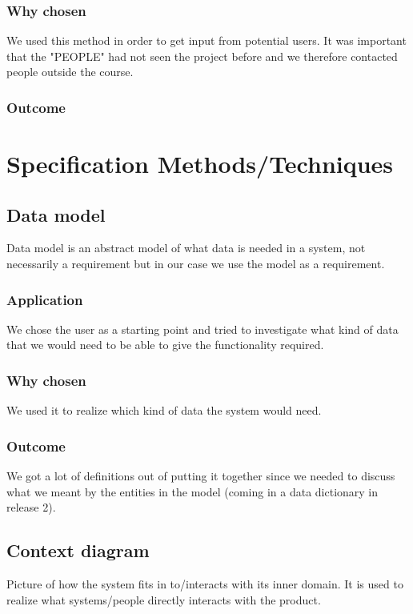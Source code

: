 \documentclass[a4paper]{article}
\begin{document}
    \subsubsection{Why chosen}
We used this method in order to get input from potential users. It was important that the "PEOPLE" had not seen the project before and we therefore contacted people outside the course.
    \subsubsection{Outcome}
 
	
	
	\section{Specification Methods/Techniques}
    \subsection{Data model}
Data model is an abstract model of what data is needed in a system, not necessarily a requirement but in our case we use the model as a requirement.
	
    \subsubsection{Application}
    We chose the user as a starting point and tried to investigate what kind of data that we would need to be able to give the functionality required.
    \subsubsection{Why chosen}
    We used it to realize which kind of data the system would need.
    \subsubsection{Outcome}
	We got a lot of definitions out of putting it together since we needed to discuss what we meant by the entities in the model (coming in a data dictionary in release 2).

    \subsection{Context diagram} \label{subsec:context}
	Picture of how the system fits in to/interacts with its inner domain. It is used to realize what systems/people directly interacts with the product.
\end{document}
